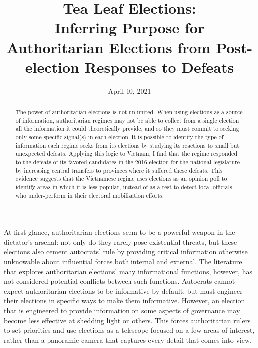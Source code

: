 \documentclass[12pt]{article}
\title{Tea Leaf Elections: \\
	Inferring Purpose for Authoritarian Elections from Post-election Responses to Defeats%
	\\
	\vspace{2ex}
	\vphantom{Online Appendix}}
\date{April 10, 2021}
\newcommand{\1}{\mathbbm{1}}
\begin{document}
	

\maketitle
\thispagestyle{empty}
\doublespacing



\begin{abstract}
The power of authoritarian elections is not unlimited. When using elections as a source of information, authoritarian regimes may not be able to collect from a single election all the information it could theoretically provide, and so they must commit to seeking only some specific signal(s) in each election. It is possible to identify the type of information each regime seeks from its elections by studying its reactions to small but unexpected defeats. Applying this logic to Vietnam, I find that the regime responded to the defeats of its favored candidates in the 2016 election for the national legislature by increasing central transfers to provinces where it suffered these defeats. This evidence suggests that the Vietnamese regime uses elections as an opinion poll to identify areas in which it is less popular, instead of as a test to detect local officials who under-perform in their electoral mobilization efforts.
\end{abstract}



\newpage



At first glance, authoritarian elections seem to be a powerful weapon in the dictator's arsenal: not only do they rarely pose existential threats, but these elections also cement autocrats' rule by providing critical information otherwise unknowable about influential forces both internal and external. The literature that explores authoritarian elections' many informational functions, however, has not considered potential conflicts between such functions. Autocrats cannot expect authoritarian elections to be informative by default, but must engineer their elections in specific ways to make them informative. However, an election that is engineered to provide information on some aspects of governance may become less effective at shedding light on others. This forces authoritarian rulers to set priorities and use elections as a telescope focused on a few areas of interest, rather than a panoramic camera that captures every detail that comes into view.
\end{document}
